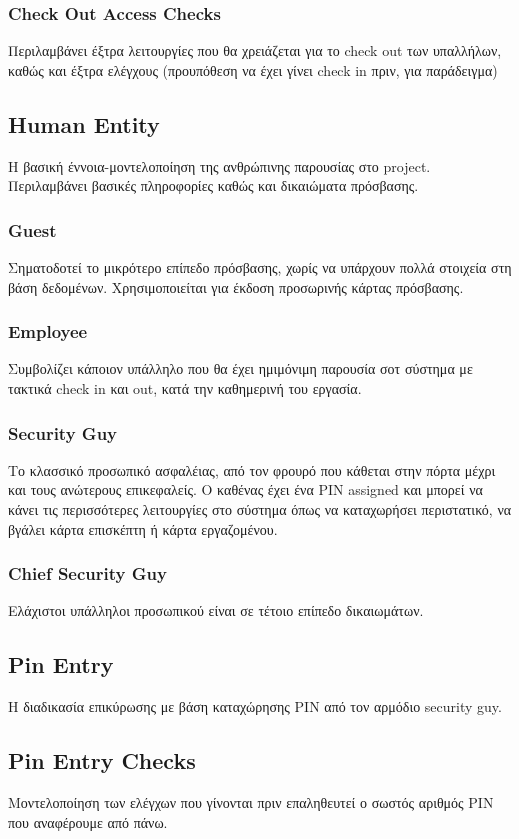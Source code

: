 \documentclass{article}
\begin{document}
\subsubsection{Check Out Access Checks}
Περιλαμβάνει έξτρα λειτουργίες που θα χρειάζεται για το check out των υπαλλήλων, καθώς και έξτρα ελέγχους (προυπόθεση να έχει γίνει check in πριν, για παράδειγμα)
\subsection{Human Entity}
Η βασική έννοια-μοντελοποίηση της ανθρώπινης παρουσίας στο project. Περιλαμβάνει βασικές πληροφορίες καθώς και δικαιώματα πρόσβασης.
\subsubsection{Guest}
Σηματοδοτεί το μικρότερο επίπεδο πρόσβασης, χωρίς να υπάρχουν πολλά στοιχεία στη βάση δεδομένων. Χρησιμοποιείται για έκδοση προσωρινής κάρτας πρόσβασης.
\subsubsection{Employee}
Συμβολίζει κάποιον υπάλληλο που θα έχει ημιμόνιμη παρουσία σοτ σύστημα με τακτικά check in και out, κατά την καθημερινή του εργασία.
\subsubsection{Security Guy}
Το κλασσικό προσωπικό ασφαλέιας, από τον φρουρό που κάθεται στην πόρτα μέχρι και τους ανώτερους επικεφαλείς. Ο καθένας έχει ένα PIN assigned και μπορεί να κάνει τις περισσότερες λειτουργίες στο σύστημα όπως να καταχωρήσει περιστατικό, να βγάλει κάρτα επισκέπτη ή κάρτα εργαζομένου.

\subsubsection{Chief Security Guy}
Ελάχιστοι υπάλληλοι προσωπικού είναι σε τέτοιο επίπεδο δικαιωμάτων. 

\subsection{Pin Entry}
Η διαδικασία επικύρωσης με βάση καταχώρησης PIN από τον αρμόδιο security guy.
\subsection{Pin Entry Checks}
Μοντελοποίηση των ελέγχων που γίνονται πριν επαληθευτεί ο σωστός αριθμός PIN που αναφέρουμε από πάνω.
\end{document}
